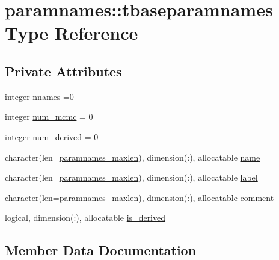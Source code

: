 \hypertarget{structparamnames_1_1tbaseparamnames}{}\section{paramnames\+:\+:tbaseparamnames Type Reference}
\label{structparamnames_1_1tbaseparamnames}
\subsection*{Private Attributes}
\begin{DoxyCompactItemize}
\item 
integer \mbox{\hyperlink{structparamnames_1_1tbaseparamnames_a8bd15ed18739cc5349e87f89d0b42ea8}{nnames}} =0
\item 
integer \mbox{\hyperlink{structparamnames_1_1tbaseparamnames_a62e18c25ce71e777be6e7c53a5c2f9a0}{num\+\_\+mcmc}} = 0
\item 
integer \mbox{\hyperlink{structparamnames_1_1tbaseparamnames_ad3074c438b18a4e94d9dd8f606d8de7d}{num\+\_\+derived}} = 0
\item 
character(len=\mbox{\hyperlink{namespaceparamnames_a4be152acd9c1eea95bdadaf3e5493495}{paramnames\+\_\+maxlen}}), dimension(\+:), allocatable \mbox{\hyperlink{structparamnames_1_1tbaseparamnames_a55127999af6fb983d7a9525bf5120cc8}{name}}
\item 
character(len=\mbox{\hyperlink{namespaceparamnames_a4be152acd9c1eea95bdadaf3e5493495}{paramnames\+\_\+maxlen}}), dimension(\+:), allocatable \mbox{\hyperlink{structparamnames_1_1tbaseparamnames_a2ee5adb7cfe79ce402c27b4b5e9235fc}{label}}
\item 
character(len=\mbox{\hyperlink{namespaceparamnames_a4be152acd9c1eea95bdadaf3e5493495}{paramnames\+\_\+maxlen}}), dimension(\+:), allocatable \mbox{\hyperlink{structparamnames_1_1tbaseparamnames_a5f1afb11a6de4ae7a143d2439b0634da}{comment}}
\item 
logical, dimension(\+:), allocatable \mbox{\hyperlink{structparamnames_1_1tbaseparamnames_a3d34f259db7819d0bc3a14ccb647902c}{is\+\_\+derived}}
\end{DoxyCompactItemize}


\subsection{Member Data Documentation}
\mbox{\label{structparamnames_1_1tbaseparamnames_a5f1afb11a6de4ae7a143d2439b0634da}} 
